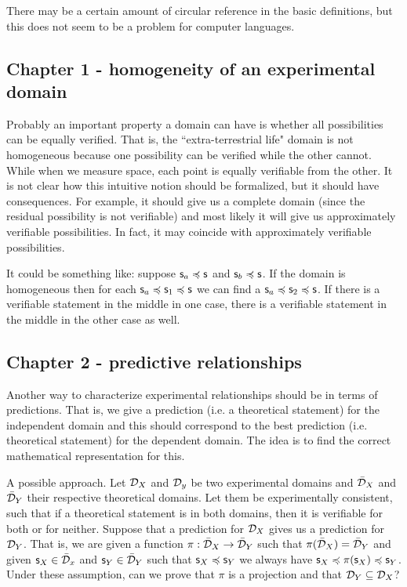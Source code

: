 \documentclass[11pt,letterpaper,fleqn]{memoir} %
\begin{document}
There may be a certain amount of circular reference in the basic definitions, but this does not seem to be a problem for computer languages.

\subsection{Chapter 1 - homogeneity of an experimental domain}

Probably an important property a domain can have is whether all possibilities can be equally verified. That is, the ``extra-terrestrial life" domain is not homogeneous because one possibility can be verified while the other cannot. While when we measure space, each point is equally verifiable from the other. It is not clear how this intuitive notion should be formalized, but it should have consequences. For example, it should give us a complete domain (since the residual possibility is not verifiable) and most likely it will give us approximately verifiable possibilities. In fact, it may coincide with approximately verifiable possibilities.

It could be something like: suppose $\mathsf{s}_a \preccurlyeq \mathsf{s}$ and $\mathsf{s}_b \preccurlyeq \mathsf{s}$. If the domain is homogeneous then for each $\mathsf{s}_a \preccurlyeq \mathsf{s}_1 \preccurlyeq \mathsf{s}$ we can find a $\mathsf{s}_a \preccurlyeq \mathsf{s}_2 \preccurlyeq \mathsf{s}$. If there is a verifiable statement in the middle in one case, there is a verifiable statement in the middle in the other case as well.

\subsection{Chapter 2 - predictive relationships}

Another way to characterize experimental relationships should be in terms of predictions. That is, we give a prediction (i.e. a theoretical statement) for the independent domain and this should correspond to the best prediction (i.e. theoretical statement) for the dependent domain. The idea is to find the correct mathematical representation for this.

A possible approach. Let $\mathcal{D}_X$ and $\mathcal{D}_y$ be two experimental domains and $\bar{\mathcal{D}}_X$ and $\bar{\mathcal{D}}_Y$ their respective theoretical domains. Let them be experimentally consistent, such that if a theoretical statement is in both domains, then it is verifiable for both or for neither. Suppose that a prediction for $\mathcal{D}_X$ gives us a prediction for $\mathcal{D}_Y$. That is, we are given a function $\pi: \bar{\mathcal{D}}_X \to \bar{\mathcal{D}}_Y$ such that $\pi(\bar{\mathcal{D}}_X) = \bar{\mathcal{D}}_Y$ and given $\mathsf{s}_X \in \bar{\mathcal{D}}_x$ and $\mathsf{s}_Y \in \bar{\mathcal{D}}_Y$ such that $\mathsf{s}_X \preccurlyeq \mathsf{s}_Y$ we always have $\mathsf{s}_X \preccurlyeq \pi(\mathsf{s}_X) \preccurlyeq \mathsf{s}_Y$. Under these assumption, can we prove that $\pi$ is a projection and that $\mathcal{D}_Y \subseteq \mathcal{D}_X$?
\end{document}
